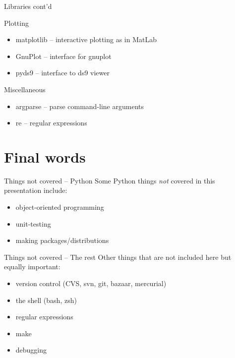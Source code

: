 \documentclass[xetex,10pt]{beamer}
\begin{document}
\begin{frame}[fragile]{Libraries cont'd}

Plotting
\begin{itemize}
\item matplotlib -- interactive plotting as in MatLab
\item GnuPlot -- interface for gnuplot
\item pyds9 -- interface to ds9 viewer
\end{itemize}

	\vspace*{1em}

Miscellaneous
\begin{itemize}
\item argparse -- parse command-line arguments
\item re -- regular expressions
\end{itemize}

\end{frame}

\section{Final words}

\begin{frame}[fragile]{Things not covered -- Python}
	Some Python things \emph{not} covered in this presentation include:
	\vspace*{1em}
	\begin{itemize}
		\item object-oriented programming
		\item unit-testing
		\item making packages/distributions
	\end{itemize}
\end{frame}

\begin{frame}[fragile]{Things not covered -- The rest}
	Other things that are not included here but equally important:
	\vspace*{1em}
	\begin{itemize}
		\item version control (CVS, svn, git, bazaar, mercurial)
		\item the shell (bash, zsh)
		\item regular expressions
		\item make
		\item debugging
	\end{itemize}
\end{frame}
\end{document}

